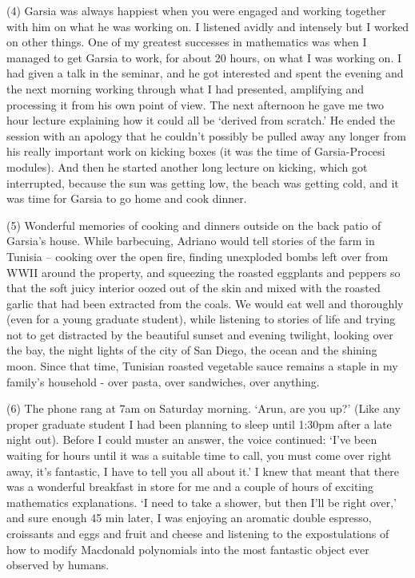 \documentclass{notices}
\begin{document}
(4) Garsia was always happiest when you were engaged and working
together with him on what he was working on.
I listened avidly and intensely but I worked on other things.  
One of my greatest successes in mathematics was
when I  managed to get Garsia to work,
for about 20 hours, on what I was working on.  
I had given a talk in the seminar, and he got interested
and spent the evening and the next morning
working through what I had presented,
amplifying and processing it from his own point of view.    
The next afternoon he gave me two hour lecture explaining
how it could all be `derived from scratch.'  
He ended the session with an apology
that he couldn't possibly be pulled away any longer
from his really important work on kicking boxes
(it was the time of Garsia-Procesi modules).  
And then he started another long lecture on kicking,
which got interrupted, because
the sun was getting low,
the beach was getting cold,
and it was time for Garsia to go home and cook dinner.

(5) Wonderful memories of cooking and dinners
outside on the back patio of Garsia's house.  
While barbecuing, Adriano would tell stories of the farm in Tunisia --
cooking over the open fire,
finding unexploded bombs left over from  WWII around the property,
and squeezing the roasted eggplants and peppers
so that the soft juicy interior  oozed out of the skin and
mixed with the  roasted garlic that had been extracted from the coals.  
We would eat well and  thoroughly
(even for a young graduate student),
while listening to stories of life and
trying not to get distracted by the beautiful sunset
and evening twilight, looking over the bay,
the night lights of the city of San Diego,
the ocean and the shining moon.
Since that time, Tunisian roasted vegetable sauce remains
a staple in my family's household - over pasta, over sandwiches, over anything.

(6) The phone rang at 7am on Saturday morning.  `Arun, are you up?'
(Like any proper graduate student
I had been planning to sleep until 1:30pm after a late night out).
Before I could muster an answer, the voice continued:
`I've been waiting for hours until it was a suitable time to call,  
you must come over right away, it's fantastic, I have to tell you all about it.'
I knew that meant that there was a wonderful breakfast in store for me
and a couple of hours of exciting mathematics explanations.  
`I need to take a shower, but then I'll be right over,'
and sure enough 45 min later,
I was enjoying an aromatic double espresso, croissants and eggs and fruit and cheese
and listening to the expostulations of how to modify Macdonald polynomials
into the most fantastic object ever observed by humans.
\end{document}
